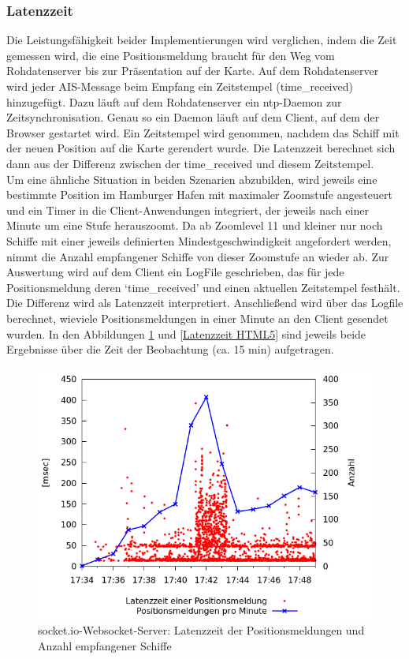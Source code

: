 \subsubsection{Latenzzeit}
Die Leistungsfähigkeit beider Implementierungen wird verglichen, indem die Zeit gemessen wird, die eine Positionsmeldung braucht für den Weg vom Rohdatenserver bis zur Präsentation auf der Karte.
Auf dem Rohdatenserver wird jeder AIS-Message beim Empfang ein Zeitstempel (time\_received) hinzugefügt. Dazu läuft auf dem Rohdatenserver ein ntp-Daemon zur Zeitsynchronisation. Genau so ein Daemon läuft auf dem Client, auf dem der Browser gestartet wird. Ein Zeitstempel wird genommen, nachdem das Schiff mit der neuen Position auf die Karte gerendert wurde. Die Latenzzeit berechnet sich dann aus der Differenz zwischen der time\_received und diesem Zeitstempel. \\
Um eine ähnliche Situation in beiden Szenarien abzubilden, wird jeweils eine bestimmte Position im Hamburger Hafen mit maximaler Zoomstufe angesteuert und ein Timer in die Client-Anwendungen integriert, der jeweils nach einer Minute um eine Stufe herauszoomt. Da ab Zoomlevel 11 und kleiner nur noch Schiffe mit einer jeweils definierten Mindestgeschwindigkeit angefordert werden, nimmt die Anzahl empfangener Schiffe von dieser Zoomstufe an wieder ab. Zur Auswertung wird auf dem Client ein LogFile geschrieben, das für jede Positionsmeldung deren ‘time\_received’ und einen aktuellen Zeitstempel festhält. Die Differenz wird als Latenzzeit interpretiert. Anschließend wird über das Logfile berechnet, wieviele Positionsmeldungen in einer Minute an den Client gesendet wurden. In den Abbildungen \ref{Latenzzeit socket.io} und \ref{Latenzzeit HTML5} sind jeweils beide Ergebnisse über die Zeit der Beobachtung (ca. 15 min) aufgetragen.
\begin {figure}[H]
\begin{center}
  \includegraphics[width=4.5in]{images/latency_timeReceived_socket_io.png}
\end{center}
\caption{socket.io-Websocket-Server: Latenzzeit der Positionsmeldungen und Anzahl empfangener Schiffe}
\label {Latenzzeit socket.io}
\end {figure}

